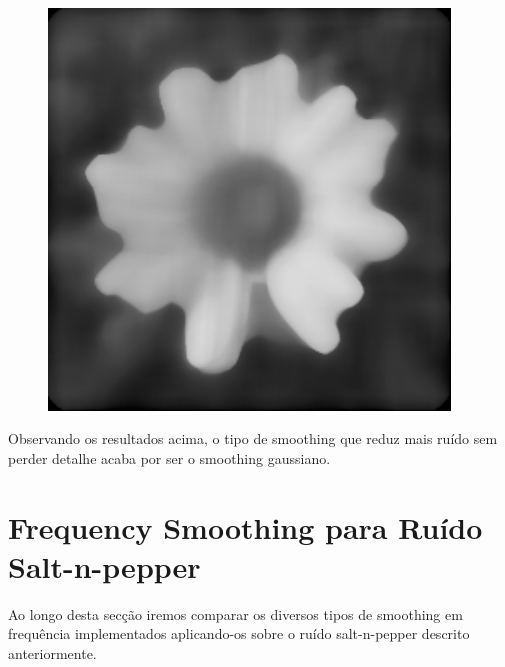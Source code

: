 \documentclass[a4paper]{report}
\begin{document}
\begin{figure}[H]
\begin{minipage}{.3\textwidth}
\end{minipage}%
\begin{minipage}{.3\textwidth}
  \centering
  \includegraphics[width=0.95\textwidth]{images/Smooth/spatial-gaussian/flower_smooth_spatial_median_20_1.png}
\end{minipage}
\end{figure}

Observando os resultados acima, o tipo de smoothing que reduz mais ruído sem perder detalhe acaba por ser
o smoothing gaussiano.

\section{Frequency Smoothing para Ruído Salt-n-pepper}
Ao longo desta secção iremos comparar os diversos tipos de smoothing em frequência implementados aplicando-os sobre o ruído
salt-n-pepper descrito anteriormente.
\end{document}
